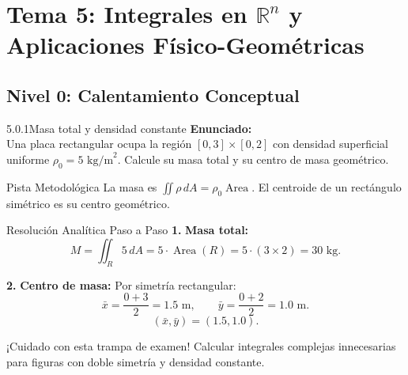 \documentclass[11pt,a4paper]{article}
\begin{document}
\section{Tema 5: Integrales en $\mathbb{R}^n$ y Aplicaciones Físico-Geométricas}

\subsection{Nivel 0: Calentamiento Conceptual}

\begin{nivelbox}{5.0.1}{Masa total y densidad constante}
\textbf{Enunciado:}\\
Una placa rectangular ocupa la región $[0, 3] \times [0, 2]$ con densidad superficial uniforme $\rho_0 = 5\text{ kg/m}^2$. Calcule su masa total y su centro de masa geométrico.

\begin{observacionbox}{Pista Metodológica}
La masa es $\iint \rho \, dA = \rho_0 \operatorname{Area}$. El centroide de un rectángulo simétrico es su centro geométrico.
\end{observacionbox}

\begin{ejerciciobox}{Resolución Analítica Paso a Paso}
\smallskip\noindent\textbf{1.} \textbf{Masa total:}
\[M = \iint_R 5 \, dA = 5 \cdot \operatorname{Area}(R) = 5 \cdot (3 \times 2) = 30\text{ kg}.\]

\smallskip\noindent\textbf{2.} \textbf{Centro de masa:}
Por simetría rectangular:
\[\bar{x} = \frac{0 + 3}{2} = 1.5\text{ m}, \qquad \bar{y} = \frac{0 + 2}{2} = 1.0\text{ m}.\]
\[(\bar{x}, \bar{y}) = (1.5, 1.0).\]
\end{ejerciciobox}

\begin{errorbox}{¡Cuidado con esta trampa de examen!}
Calcular integrales complejas innecesarias para figuras con doble simetría y densidad constante.
\end{errorbox}
\end{nivelbox}
\bigskip
\end{document}
